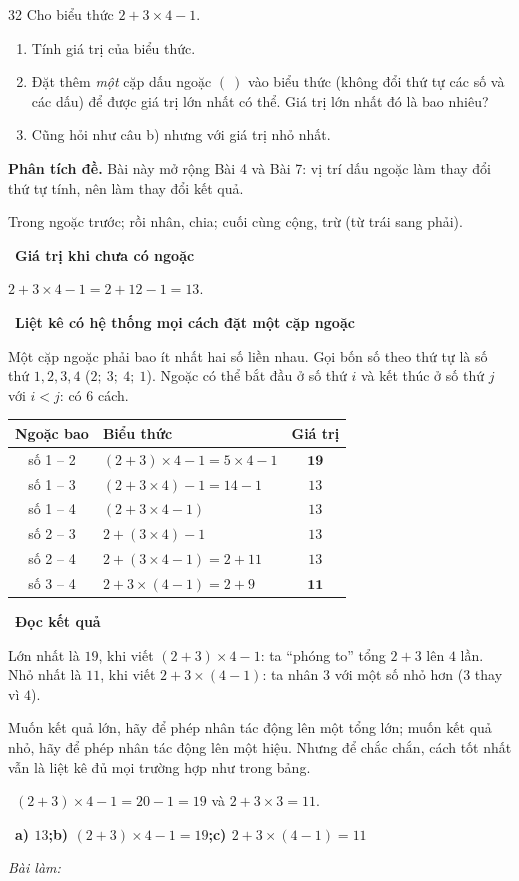 \documentclass[11pt]{article}
\newif\ifsol \solfalse
\providecommand{\AnsWord}{Đáp số}
\newcommand{\ans}[1]{\par\smallskip{\bfseries\color{tmGreen!88!black}\AnsWord:}\ {\bfseries\color{AnsRed}#1}\par}
\newcommand{\probsol}[1]{%
  \begin{lrbox}{\solmeasure}\begin{minipage}{\dimexpr\linewidth-24pt\relax}#1\end{minipage}\end{lrbox}%
  \ifsol
    \begin{solbox}#1\end{solbox}%
  \else
    \setlength{\solht}{\dimexpr\ht\solmeasure+\dp\solmeasure+0.85cm\relax}%
    \ifdim\solht<1.35cm\setlength{\solht}{1.35cm}\fi
    \ifdim\solht>\StudentMaxWork\setlength{\solht}{\StudentMaxWork}\fi
    \begin{tcolorbox}[colback=white,colframe=Line,boxrule=0.8pt,arc=5pt,
      left=8pt,right=8pt,top=4pt,bottom=4pt,height=\solht]{\footnotesize\color{Slate}\itshape\WorkWord}\end{tcolorbox}%
  \fi}
\newlength{\StudentMaxWork}\setlength{\StudentMaxWork}{7.5cm}
\newcommand{\step}[2]{\par\smallskip\noindent{\bfseries\color{tmBlue!85!black}\StepWord~#1.}\ {\bfseries #2}\par\nopagebreak}
\newcommand{\verify}[1]{\par\smallskip\noindent{\bfseries\color{tmGreen!80!black}\faCheckCircle\ \CheckWord}\ #1\par}
\def\WorkWord{Bài làm:}
\def\AnsWord{Đáp số}
\def\StepWord{Bước}
\def\CheckWord{Thử lại:}
\begin{document}
\begin{probbox}{32}{\relax}
Cho biểu thức $2 + 3 \times 4 - 1$.
\begin{enumerate}[label=\alph*),leftmargin=1.6em,itemsep=0pt,topsep=2pt]
  \item Tính giá trị của biểu thức.
  \item Đặt thêm \emph{một} cặp dấu ngoặc $(\ )$ vào biểu thức (không đổi thứ tự các số và các dấu) để được giá trị
  lớn nhất có thể. Giá trị lớn nhất đó là bao nhiêu?
  \item Cũng hỏi như câu b) nhưng với giá trị nhỏ nhất.
\end{enumerate}
\end{probbox}
\probsol{
\textbf{Phân tích đề.} Bài này mở rộng Bài 4 và Bài 7: vị trí dấu ngoặc làm thay đổi thứ tự tính, nên làm thay đổi kết quả.
\begin{recallbox}Trong ngoặc trước; rồi nhân, chia; cuối cùng cộng, trừ (từ trái sang phải).\end{recallbox}
\step{1}{Giá trị khi chưa có ngoặc}
$2 + 3\times 4 - 1 = 2 + 12 - 1 = 13$.
\step{2}{Liệt kê có hệ thống mọi cách đặt một cặp ngoặc}
Một cặp ngoặc phải bao ít nhất hai số liền nhau. Gọi bốn số theo thứ tự là số thứ $1, 2, 3, 4$ ($2;\ 3;\ 4;\ 1$).
Ngoặc có thể bắt đầu ở số thứ $i$ và kết thúc ở số thứ $j$ với $i < j$: có $6$ cách.
\begin{center}
\begin{tabular}{|c|l|c|}
\hline
\rowcolor{tmBlue!10} Ngoặc bao & Biểu thức & Giá trị\\ \hline
số 1 -- 2 & $(2+3)\times 4 - 1 = 5\times 4 - 1$ & $\mathbf{19}$\\ \hline
số 1 -- 3 & $(2+3\times 4) - 1 = 14 - 1$ & $13$\\ \hline
số 1 -- 4 & $(2+3\times 4-1)$ & $13$\\ \hline
số 2 -- 3 & $2 + (3\times 4) - 1$ & $13$\\ \hline
số 2 -- 4 & $2 + (3\times 4 - 1) = 2 + 11$ & $13$\\ \hline
số 3 -- 4 & $2 + 3\times(4 - 1) = 2 + 9$ & $\mathbf{11}$\\ \hline
\end{tabular}
\end{center}
\step{3}{Đọc kết quả}
Lớn nhất là $19$, khi viết $(2+3)\times 4 - 1$: ta ``phóng to'' tổng $2 + 3$ lên $4$ lần.\\
Nhỏ nhất là $11$, khi viết $2 + 3\times(4-1)$: ta nhân $3$ với một số nhỏ hơn ($3$ thay vì $4$).
\begin{tipbox}Muốn kết quả lớn, hãy để phép nhân tác động lên một tổng lớn; muốn kết quả nhỏ, hãy để phép nhân tác động
lên một hiệu. Nhưng để chắc chắn, cách tốt nhất vẫn là liệt kê đủ mọi trường hợp như trong bảng.\end{tipbox}
\verify{$(2+3)\times 4 - 1 = 20 - 1 = 19$ và $2 + 3\times 3 = 11$.}
\ans{a) $13$;\quad b) $(2+3)\times 4 - 1 = 19$;\quad c) $2 + 3\times(4-1) = 11$}
}
\end{document}
